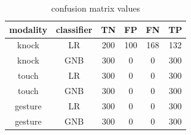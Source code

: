 \begin{table}[h]
\centering
\begin{tabular}{|c|c|c|c|c|c|}
\hline
modality & classifier & TN & FP & FN & TP \\ \hline
knock & LR & 200 & 100 & 168 & 132 \\
knock & GNB & 300 & 0 & 0 & 300 \\
touch & LR & 300 & 0 & 0 & 300 \\
touch & GNB & 300 & 0 & 0 & 300 \\
gesture & LR & 300 & 0 & 0 & 300 \\
gesture & GNB & 300 & 0 & 0 & 300 \\
\hline
\end{tabular}
\caption{confusion matrix values}
\label{tab:T05}
\end{table}
